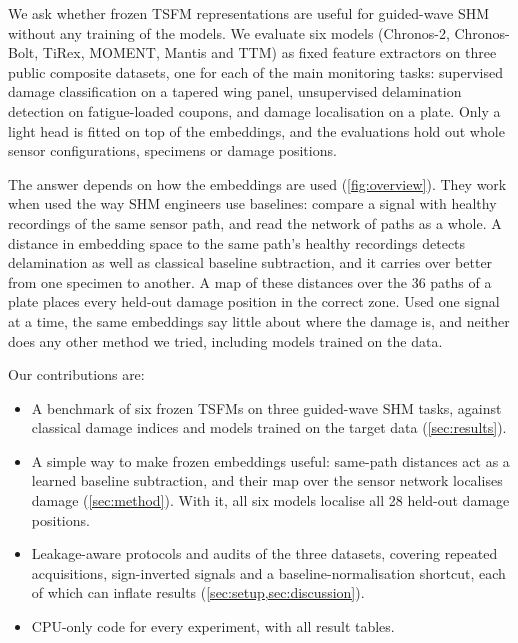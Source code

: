 \documentclass{article}
\begin{document}
We ask whether frozen TSFM representations are useful for guided-wave SHM without any training of the
models. We evaluate six models (Chronos-2, Chronos-Bolt, TiRex, MOMENT, Mantis and TTM) as fixed feature
extractors on three public composite datasets, one for each of the main monitoring tasks: supervised
damage classification on a tapered wing panel, unsupervised delamination detection on fatigue-loaded
coupons, and damage localisation on a plate. Only a light head is fitted on top of the embeddings, and the
evaluations hold out whole sensor configurations, specimens or damage positions.

The answer depends on how the embeddings are used (\cref{fig:overview}). They work when used the way SHM
engineers use baselines: compare a signal with healthy recordings of the same sensor path, and read the
network of paths as a whole. A distance in embedding space to the same path's healthy recordings detects
delamination as well as classical baseline subtraction, and it carries over better from one specimen to
another. A map of these distances over the 36 paths of a plate places every held-out damage position in
the correct zone. Used one signal at a time, the same embeddings say little about where the damage is,
and neither does any other method we tried, including models trained on the data.

Our contributions are:
\begin{itemize}
  \setlength\itemsep{0.1em}
  \item A benchmark of six frozen TSFMs on three guided-wave SHM tasks, against classical damage indices
        and models trained on the target data (\cref{sec:results}).
  \item A simple way to make frozen embeddings useful: same-path distances act as a learned baseline
        subtraction, and their map over the sensor network localises damage (\cref{sec:method}). With it,
        all six models localise all 28 held-out damage positions.
  \item Leakage-aware protocols and audits of the three datasets, covering repeated acquisitions,
        sign-inverted signals and a baseline-normalisation shortcut, each of which can inflate results
        (\cref{sec:setup,sec:discussion}).
  \item CPU-only code for every experiment, with all result tables.
\end{itemize}



\end{document}
